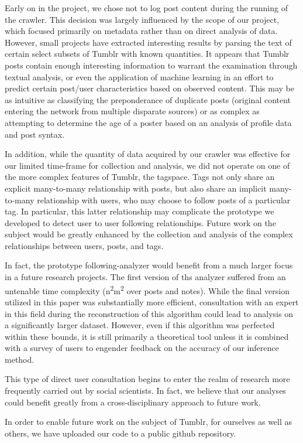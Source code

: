 Early on in the project, we chose not to log post content during the 
running of the crawler.  This decision was largely influenced by the 
scope of our project, which focused primarily on metadata rather than 
on direct analysis of data.  However, small projects have extracted 
interesting results\cite{konczal2011parsing} by parsing the text of 
certain select subsets of Tumblr with known quantities.  It appears 
that Tumblr posts contain enough interesting information to warrant 
the examination through textual analysis, or even the application of 
machine learning in an effort to predict certain post/user 
characteristics based on observed content.  This may be as intuitive 
as classifying the preponderance of duplicate posts (original content 
entering the network from multiple disparate sources) or as complex as 
attempting to determine the age of a poster based on an analysis of 
profile data and post syntax.


In addition, while the quantity of data acquired by our crawler was 
effective for our limited time-frame for collection and analysis, we 
did not operate on one of the more complex features of Tumblr, the 
tagspace.  Tags not only share an explicit many-to-many relationship 
with posts, but also share an implicit many-to-many relationship with 
users, who may choose to follow posts of a particular tag.  In 
particular, this latter relationship may complicate the prototype we 
developed to detect user to user following relationships.  Future 
work on the subject would be greatly enhanced by the collection and 
analysis of the complex relationships between users, posts, and tags.


In fact, the prototype following-analyzer would benefit from a much 
larger focus in a future research projects.  The first version of ths 
analyzer suffered from an untenable time complexity 
(n\textsuperscript{2}m\textsuperscript{2} over posts and notes).
While the final version utilized in this paper was substantially 
more efficient, consultation with an expert in this field during the 
reconstruction of this algorithm could lead to analysis on a 
significantly larger dataset.  However, even if this algorithm was 
perfected within these bounds, it is still primarily a theoretical 
tool unless it is combined with a survey of users to engender feedback 
on the accuracy of our inference method.


This type of direct user consultation begins to enter the realm of 
research more frequently carried out by social scientists.  In fact, 
we believe that our analyses could benefit greatly from a 
cross-disciplinary approach to future work.



In order to enable future work on the subject of Tumblr, for ourselves 
as well as others, we have uploaded our code to a public github 
repository.


